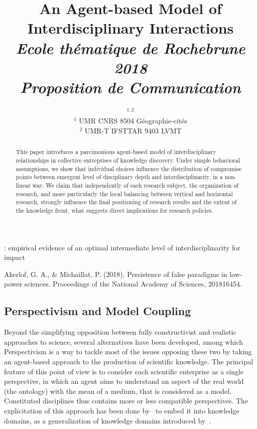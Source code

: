 


\title{An Agent-based Model of Interdisciplinary Interactions\\\medskip
\textit{Ecole thématique de Rochebrune 2018\\
Proposition de Communication
}
}
\author{$^{1,2}$\\
$^{1}$ UMR CNRS 8504 Géographie-cités\\
$^{2}$ UMR-T IFSTTAR 9403 LVMT
}
\date{}


\maketitle

\justify

\begin{abstract}
	This paper introduces a parcimonious agent-based model of interdisciplinary relationships in collective entreprises of knowledge discovery. Under simple behavioral assumptions, we show that individual choices influence the distribution of compromise points between emergent level of disciplinary depth and interdisciplinarity, in a non-linear way. We claim that independently of each research subject, the organization of research, and more particularly the local balancing between vertical and horizontal research, strongly influence the final positioning of research results and the extent of the knowledge front, what suggests direct implications for research policies.
\end{abstract}


\cite{lariviere2010relationship} : empirical evidence of an optimal intermediate level of interdisciplinarity for impact %


Akerlof, G. A., & Michaillat, P. (2018). Persistence of false paradigms in low-power sciences. Proceedings of the National Academy of Sciences, 201816454.


\subsection*{Perspectivism and Model Coupling}

Beyond the simplifying opposition between fully constructivist and realistic approaches to science, several alternatives have been developed, among which Perspectivism \cite{giere2010scientific} is a way to tackle most of the issues opposing these two by taking an agent-based approach to the production of scientific knowledge. The principal feature of this point of view is to consider each scientific enterprise as a single perspective, in which an agent aims to understand an aspect of the real world (the ontology) with the mean of a medium, that is considered as a model. Constituted disciplines thus contains more or less compatible perspectives. The explicitation of this approach has been done by~\cite{raimbault2017knowledge} to embed it into knowledge domains, as a generalization of knowledge domains introduced by~\cite{livet2010}.


